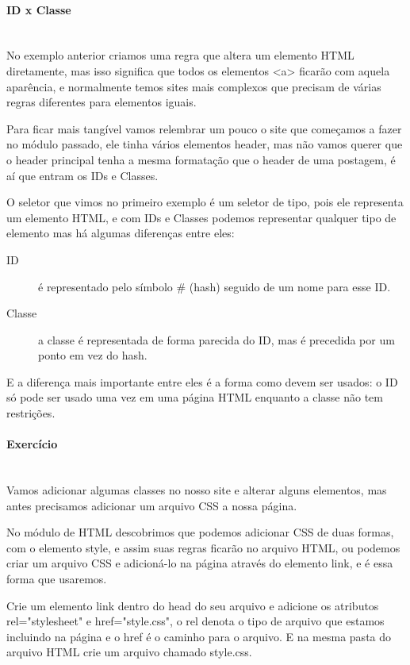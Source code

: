 \documentclass[12pt,a4paper]{article}
\begin{document}
	\paragraph{ID x Classe} \mbox{} \\
	
	No exemplo anterior criamos uma regra que altera um elemento HTML diretamente, mas isso significa que todos os elementos <a> ficarão com aquela aparência, e normalmente temos sites mais complexos que precisam de várias regras diferentes para elementos iguais.
	
	Para ficar mais tangível vamos relembrar um pouco o site que começamos a fazer no módulo passado, ele tinha vários elementos header, mas não vamos querer que o header principal tenha a mesma formatação que o header de uma postagem, é aí que entram os IDs e Classes.
	
	O seletor que vimos no primeiro exemplo é um seletor de tipo, pois ele representa um elemento HTML, e com IDs e Classes podemos representar qualquer tipo de elemento mas há algumas diferenças entre eles:
	
	\begin{description}
		\item[ID] é representado pelo símbolo \# (hash) seguido de um nome para esse ID.
		
		\item[Classe] a classe é representada de forma parecida do ID, mas é precedida por um ponto em vez do hash.
	\end{description} 
	
	E a diferença mais importante entre eles é a forma como devem ser usados: o ID só pode ser usado uma vez em uma página HTML enquanto a classe não tem restrições.
	
	\paragraph{Exercício} \mbox{} \\
	
	Vamos adicionar algumas classes no nosso site e alterar alguns elementos, mas antes precisamos adicionar um arquivo CSS a nossa página.
	
	No módulo de HTML descobrimos que podemos adicionar CSS de duas formas, com o elemento style, e assim suas regras ficarão no arquivo HTML, ou podemos criar um arquivo CSS e adicioná-lo na página através do elemento link, e é essa forma que usaremos.
	
	Crie um elemento link dentro do head do seu arquivo e adicione os atributos rel="stylesheet" e href="style.css", o rel denota o tipo de arquivo que estamos incluindo na página e o href é o caminho para o arquivo. E na mesma pasta do arquivo HTML crie um arquivo chamado style.css.
	
\end{document}
